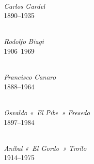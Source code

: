 \vspace*{\fill}

\noindent
\begin{minipage}[t]{0.429\textwidth}
  \begin{flushleft}
    \\[0.3em]
    {\figcaptionname\itshape Carlos Gardel}\\[-6pt]
    {\figcaptiondetail\textup{1890--1935}}
  \end{flushleft}
\end{minipage}
\hfill
\begin{minipage}[t]{0.536\textwidth}
  \begin{flushright}
    \\[0.3em]
    {\figcaptionname\itshape Rodolfo Biagi}\\[-6pt]
    {\figcaptiondetail\textup{1906--1969}}
  \end{flushright}
\end{minipage}

\vspace{2\baselineskip}

\noindent
\begin{minipage}[t]{0.247\textwidth}
  \centering
  \\[0.3em]
  {\figcaptionname\itshape Francisco Canaro}\\[-6pt]
  {\figcaptiondetail\textup{1888--1964}}
\end{minipage}
\hfill
\begin{minipage}[t]{0.277\textwidth}
  \centering
  \\[0.3em]
  {\figcaptionname\itshape Osvaldo «~El Pibe~» Fresedo}\\[-6pt]
  {\figcaptiondetail \textup{1897--1984}}
\end{minipage}
\hfill
\begin{minipage}[t]{0.406\textwidth}
  \centering
  \\[0.3em]
  {\figcaptionname\itshape Aníbal «~El Gordo~» Troilo}\\[-6pt]
  {\figcaptiondetail\textup{1914--1975}}
\end{minipage}

\vspace*{\fill}

